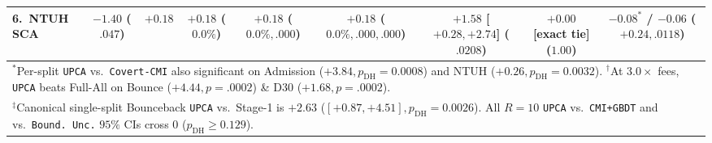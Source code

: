 \documentclass[11pt]{article}
\theoremstyle{remark}
\begin{document}
\begin{table}[t]
{\begin{tabular}{lcccccccc}
6.\ NTUH SCA & $-1.40$ ($.047$) & $+0.18$ & $+0.18$ ($0.0\%$) & $+0.18$ ($0.0\%, .000$) & $\mathbf{+0.18}$ ($0.0\%, .000, .000$) & $\mathbf{+1.58}$ [$+0.28,+2.74$] ($\mathbf{.0208}$) & $+0.00$ [exact tie] ($1.00$) & $-0.08^*$ / $-0.06$ ($\mathbf{+0.24, .0118}$) \\
\bottomrule
\multicolumn{9}{l}{\footnotesize $^*$Per-split \texttt{UPCA} vs.\ \texttt{Covert-CMI} also significant on Admission ($+3.84, p_{\text{DH}}=0.0008$) and NTUH ($+0.26, p_{\text{DH}}=0.0032$). $^\dagger$At $3.0\times$ fees, \texttt{UPCA} beats Full-All on Bounce ($+4.44, p=.0002$) \& D30 ($+1.68, p=.0002$).}\\
\multicolumn{9}{l}{\footnotesize $^\ddagger$Canonical single-split Bounceback \texttt{UPCA} vs.\ Stage-1 is $+2.63$ ($[+0.87, +4.51], p_{\text{DH}}=0.0026$). All $R=10$ \texttt{UPCA} vs.\ \texttt{CMI+GBDT} and vs.\ \texttt{Bound.\ Unc.} $95\%$ CIs cross $0$ ($p_{\text{DH}} \ge 0.129$).}
\end{tabular}%
}
\end{table}
\end{document}
